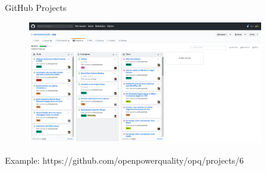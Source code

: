 \documentclass{beamer}
\begin{document}
    \begin{frame}{GitHub Projects}
        \begin{figure}
            \centering
            \includegraphics[width=0.9\textwidth]{figures/github_project.png}
        \end{figure}
        \centering
        Example: https://github.com/openpowerquality/opq/projects/6
    \end{frame}
\end{document}
